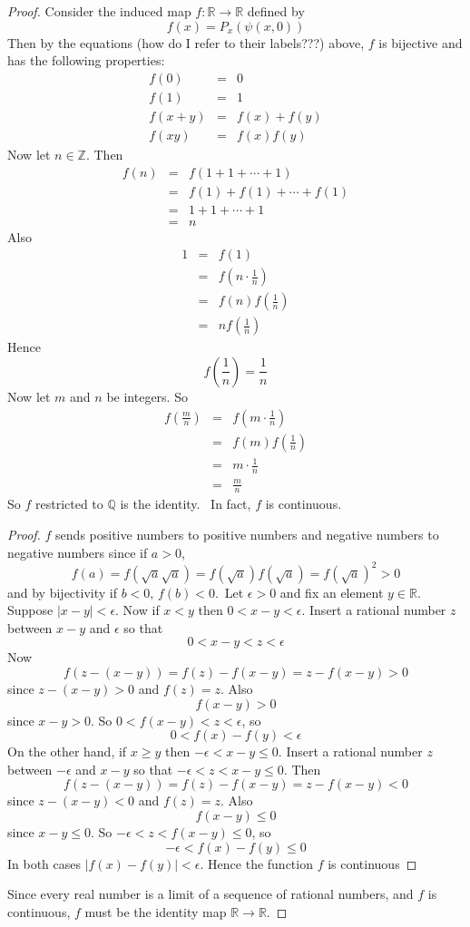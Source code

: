 \documentclass[honours]{UNSWthesis}
\newcommand{\R}{\mathbb{R}}
\newcommand{\Z}{\mathbb{Z}}
\newcommand{\Q}{\mathbb{Q}}
\newcommand{\1}{\mathbf{e}_{1}}
\newcommand{\2}{\mathbf{e}_{3}}
\newcommand{\3}{\mathbf{e}_{3}}
\begin{document}
\begin{proof}
Consider the induced map $f:\R \longrightarrow \R$ defined by
\[
f(x)=P_{x}(\psi(x,0))
\]
Then by the equations (how do I refer to their labels???) above, $f$ is bijective and has the following properties:
\begin{eqnarray*}
f(0) &=& 0 \\
f(1) &=& 1 \\
f(x+y)&=& f(x)+f(y) \\
f(xy) &=& f(x)f(y)
\end{eqnarray*} 
Now let $n \in \Z$. Then 
\begin{eqnarray*}
f(n) &=& f(1+1+ \cdots +1) \\
&=&f(1)+f(1) + \cdots +f(1) \\
&=& 1+1+ \cdots +1 \\
&=& n
\end{eqnarray*}
Also 
\begin{eqnarray*}
1 &=&f(1) \\
 &=& f\left( n \cdot \frac{1}{n} \right) \\
&=& f(n)f\left( \frac{1}{n} \right) \\
&=& nf\left( \frac{1}{n} \right)
\end{eqnarray*}
Hence 
\[
f \left( \frac{1}{n} \right)=\frac{1}{n}
\]
Now let $m$ and $n$ be integers. So 
\begin{eqnarray*}
f \left(\frac{m}{n}\right)&=&f\left(m \cdot \frac{1}{n}\right)\\
&=& f(m)f\left(\frac{1}{n}\right) \\
&=& m\cdot \frac{1}{n} \\
&=& \frac{m}{n}
\end{eqnarray*}
So $f$ restricted to $\Q$ is the identity. \
In fact, $f$ is continuous.
\begin{proof}
$f$ sends positive numbers to positive numbers and negative numbers to negative numbers since if $a>0$,
\[
f(a)=f(\sqrt{a}\sqrt{a})=f(\sqrt{a})f(\sqrt{a})=f(\sqrt{a})^{2}>0
\]
and by bijectivity if $b<0$, $f(b)<0$.\
Let $\epsilon >0$ and fix an element $y \in \R$. Suppose $|x-y|<\epsilon$. Now if $x<y$ then $0<x-y<\epsilon$. Insert a rational number $z$ between $x-y$ and $\epsilon$ so that
\[
0<x-y<z<\epsilon
\]
Now
\[
f(z-(x-y))=f(z)-f(x-y)=z-f(x-y)>0
\]
since $z-(x-y)>0$ and $f(z)=z$. Also
\[
f(x-y)>0
\]
since $x-y>0$. So $0<f(x-y)<z<\epsilon$, so
\[
0<f(x)-f(y)<\epsilon
\]
On the other hand, if $x \geq y $ then $-\epsilon<x-y \leq 0$. Insert a rational number $z$ between $-\epsilon$ and $x-y$ so that $-\epsilon<z<x-y \leq 0$. Then 
\[
f(z-(x-y))=f(z)-f(x-y)=z-f(x-y)<0
\]
since $z-(x-y)<0$ and $f(z)=z$. Also
\[
f(x-y)\leq 0
\]
since $x-y \leq 0$. So $-\epsilon<z<f(x-y)\leq 0$, so
\[
-\epsilon < f(x)-f(y) \leq 0
\]
In both cases $|f(x)-f(y)|<\epsilon$. Hence the function $f$ is continuous
\end{proof}
Since every real number is a limit of a sequence of rational numbers, and $f$ is continuous, $f$ must be the identity map $\R \longrightarrow \R$. 


\end{proof}
\end{document}
